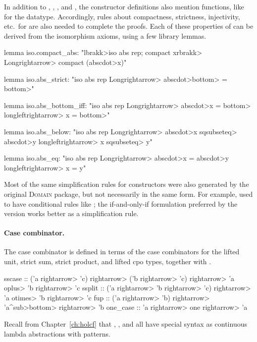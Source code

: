 In addition to , , , and , the constructor definitions
also mention  functions, like  for the  datatype. Accordingly, rules about compactness, strictness, injectivity, etc.\ for  are also needed to complete the proofs. Each of these properties of  can be derived from the isomorphism axioms, using a few library lemmas.

\begin{isacode}
lemma iso.compact_abs: "\<lbrakk>iso abs rep; compact x\<rbrakk> \<Longrightarrow> compact (abs\<cdot>x)"
\end{isacode}
\unmedskip
{}
\begin{isacode}
lemma iso.abs_strict: "iso abs rep \<Longrightarrow> abs\<cdot>\<bottom> = \<bottom>"
\end{isacode}
\unmedskip
{}
\begin{isacode}
lemma iso.abs_bottom_iff: "iso abs rep \<Longrightarrow> abs\<cdot>x = \<bottom> \<longleftrightarrow> x = \<bottom>"
\end{isacode}
\unmedskip
{}
\begin{isacode}
lemma iso.abs_below: "iso abs rep \<Longrightarrow> abs\<cdot>x \<sqsubseteq> abs\<cdot>y \<longleftrightarrow> x \<sqsubseteq> y"
\end{isacode}
\unmedskip
{}
\begin{isacode}
lemma iso.abs_eq: "iso abs rep \<Longrightarrow> abs\<cdot>x = abs\<cdot>y \<longleftrightarrow> x = y"
\end{isacode}

Most of the same simplification rules for constructors were also generated by the original  \textsc{Domain} package, but not necessarily in the same form. For example,  used to have conditional rules like ; the if-and-only-if formulation preferred by the  version works better as a simplification rule.

\paragraph{Case combinator.}

The case combinator  is defined in terms of the case combinators for the lifted unit, strict sum, strict product, and lifted cpo types, together with .
%
\begin{isacode}
sscase :: ('a \<rightarrow> 'c) \<rightarrow> ('b \<rightarrow> 'c) \<rightarrow> 'a \<oplus> 'b \<rightarrow> 'c
ssplit :: ('a \<rightarrow> 'b \<rightarrow> 'c) \<rightarrow> 'a \<otimes> 'b \<rightarrow> 'c
fup :: ('a \<rightarrow> 'b) \<rightarrow> 'a\<^sub>\<bottom> \<rightarrow> 'b
one_case :: 'a \<rightarrow> one \<rightarrow> 'a
\end{isacode}
%
Recall from Chapter~\ref{ch:holcf} that , , and  all have special syntax as continuous lambda abstractions with patterns.

